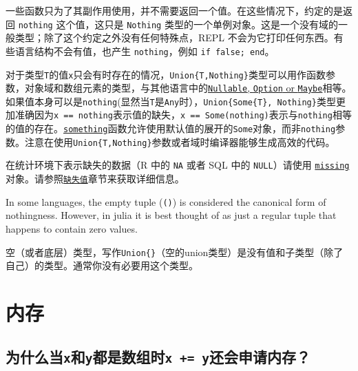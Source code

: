 一些函数只为了其副作用使用，并不需要返回一个值。在这些情况下，约定的是返回 \texttt{nothing} 这个值，这只是 \texttt{Nothing} 类型的一个单例对象。这是一个没有域的一般类型；除了这个约定之外没有任何特殊点，REPL 不会为它打印任何东西。有些语言结构不会有值，也产生 \texttt{nothing}，例如 \texttt{if false; end}。



对于类型\texttt{T}的值\texttt{x}只会有时存在的情况，\texttt{Union\{T,Nothing\}}类型可以用作函数参数，对象域和数组元素的类型，与其他语言中的\href{https://en.wikipedia.org/wiki/Nullable\_type}{\texttt{Nullable}, \texttt{Option} or \texttt{Maybe}}相等。如果值本身可以是\texttt{nothing}(显然当\texttt{T}是\texttt{Any}时），\texttt{Union\{Some\{T\}, Nothing\}}类型更加准确因为\texttt{x == nothing}表示值的缺失，\texttt{x == Some(nothing)}表示与\texttt{nothing}相等的值的存在。\hyperlink{12366229165852827603}{\texttt{something}}函数允许使用默认值的展开的\texttt{Some}对象，而非\texttt{nothing}参数。注意在使用\texttt{Union\{T,Nothing\}}参数或者域时编译器能够生成高效的代码。



在统计环境下表示缺失的数据（R 中的 \texttt{NA} 或者 SQL 中的 \texttt{NULL}）请使用 \hyperlink{14596725676261444434}{\texttt{missing}} 对象。请参照\hyperlink{5842114294087241506}{\texttt{缺失值}}章节来获取详细信息。



In some languages, the empty tuple (\texttt{()}) is considered the canonical form of nothingness. However, in julia it is best thought of as just a regular tuple that happens to contain zero values.



空（或者{\textquotedbl}底层{\textquotedbl}）类型，写作\texttt{Union\{\}}（空的union类型）是没有值和子类型（除了自己）的类型。通常你没有必要用这个类型。



\hypertarget{12500994751877938228}{}


\section{内存}



\hypertarget{2527646600001256276}{}


\subsection{为什么当\texttt{x}和\texttt{y}都是数组时\texttt{x += y}还会申请内存？}




